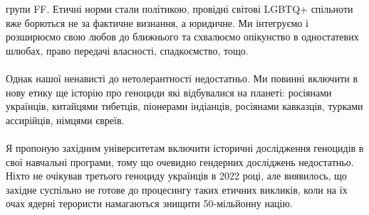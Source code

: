 групи FF. Етичні норми стали політикою, провідні світові LGBTQ+ спільноти вже
борються не за фактичне визнання, а юридичне. Ми інтегруємо і розширюємо свою
любов до ближнього та схвалюємо опікунство в одностатевих шлюбах, право
передачі власності, спадкоємство, тощо.
\\
\\
Однак нашої ненависті до нетолерантності недостатньо. Ми повинні включити в
нову етику ще історію про геноциди які відбувалися на планеті: росіянами
українців, китайцями тибетців, піонерами індіанців, росіянами кавказців,
турками ассирійців, німцями євреїв.
\\
\\
Я пропоную західним університетам включити історичні дослідження геноцидів
в свої навчальні програми, тому що очевидно гендерних досліджень недостатньо.
Ніхто не очікував третього геноциду українців в 2022 році, але виявилось, що
західне суспільно не готове до процесингу таких етичних викликів, коли на їх
очах ядерні терористи намагаються знищити 50-мільйонну націю.

\normalsize
